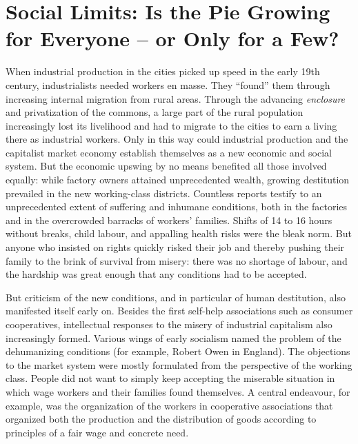\documentclass[
  british,
  a4paper,
  DIV=11,
  numbers=noendperiod,
  oneside,
  openany]{scrreprt}
\begin{document}
\section{Social Limits: Is the Pie Growing for Everyone -- or Only for a
Few?}\label{social-limits-is-the-pie-growing-for-everyone-or-only-for-a-few}

When industrial production in the cities picked up speed in the early
19th century, industrialists needed workers en masse. They ``found''
them through increasing internal migration from rural areas. Through the
advancing \emph{enclosure} and privatization of the commons, a large
part of the rural population increasingly lost its livelihood and had to
migrate to the cities to earn a living there as industrial workers. Only
in this way could industrial production and the capitalist market
economy establish themselves as a new economic and social system. But
the economic upswing by no means benefited all those involved equally:
while factory owners attained unprecedented wealth, growing destitution
prevailed in the new working-class districts. Countless reports testify
to an unprecedented extent of suffering and inhumane conditions, both in
the factories and in the overcrowded barracks of workers' families.
Shifts of 14 to 16 hours without breaks, child labour, and appalling
health risks were the bleak norm. But anyone who insisted on rights
quickly risked their job and thereby pushing their family to the brink
of survival from misery: there was no shortage of labour, and the
hardship was great enough that any conditions had to be accepted.

But criticism of the new conditions, and in particular of human
destitution, also manifested itself early on. Besides the first
self-help associations such as consumer cooperatives, intellectual
responses to the misery of industrial capitalism also increasingly
formed. Various wings of early socialism named the problem of the
dehumanizing conditions (for example, Robert Owen in England). The
objections to the market system were mostly formulated from the
perspective of the working class. People did not want to simply keep
accepting the miserable situation in which wage workers and their
families found themselves. A central endeavour, for example, was the
organization of the workers in cooperative associations that organized
both the production and the distribution of goods according to
principles of a fair wage and concrete need.
\end{document}
